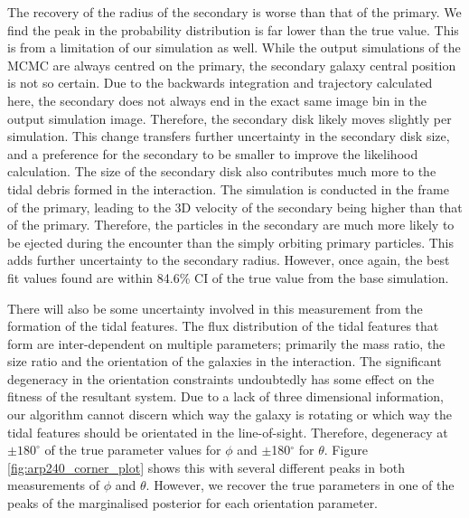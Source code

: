 The recovery of the radius of the secondary is worse than that of the primary. We find the peak in the probability distribution is far lower than the true value. This is from a limitation of our simulation as well. While the output simulations of the MCMC are always centred on the primary, the secondary galaxy central position is not so certain. Due to the backwards integration and trajectory calculated here, the secondary does not always end in the exact same image bin in the output simulation image. Therefore, the secondary disk likely moves slightly per simulation. This change transfers further uncertainty in the secondary disk size, and a preference for the secondary to be smaller to improve the likelihood calculation. The size of the secondary disk also contributes much more to the tidal debris formed in the interaction. The simulation is conducted in the frame of the primary, leading to the 3D velocity of the secondary being higher than that of the primary. Therefore, the particles in the secondary are much more likely to be ejected during the encounter than the simply orbiting primary particles. This adds further uncertainty to the secondary radius. However, once again, the best fit values found are within 84.6\% CI of the true value from the base simulation. 

There will also be some uncertainty involved in this measurement from the formation of the tidal features. The flux distribution of the tidal features that form are inter-dependent on multiple parameters; primarily the mass ratio, the size ratio and the orientation of the galaxies in the interaction. The significant degeneracy in the orientation constraints undoubtedly has some effect on the fitness of the resultant system. Due to a lack of three dimensional information, our algorithm cannot discern which way the galaxy is rotating or which way the tidal features should be orientated in the line-of-sight. Therefore, degeneracy at $\pm180^{\circ}$ of the true parameter values for $\phi$ and $\pm$180$^{\circ}$ for $\theta$. Figure \ref{fig:arp240_corner_plot} shows this with several different peaks in both measurements of $\phi$ and $\theta$. However, we recover the true parameters in one of the peaks of the marginalised posterior for each orientation parameter.

